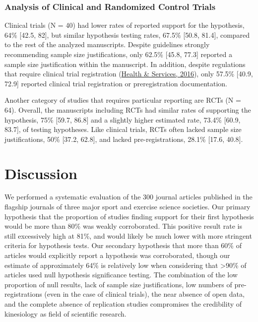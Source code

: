 \documentclass[]{cik}%
\begin{document}
\newpage

\hypertarget{analysis-of-clinical-and-randomized-control-trials}{%
\subsubsection{Analysis of Clinical and Randomized Control
Trials}\label{analysis-of-clinical-and-randomized-control-trials}}

Clinical trials (N = 40) had lower rates of reported support for the
hypothesis, 64\% {[}42.5, 82{]}, but similar hypothesis testing rates,
67.5\% {[}50.8, 81.4{]}, compared to the rest of the analyzed
manuscripts. Despite guidelines strongly recommending sample size
justifications, only 62.5\% {[}45.8, 77.3{]} reported a sample size
justification within the manuscript. In addition, despite regulations
that require clinical trial registration
(\protect\hyperlink{ref-clinreg2016}{Health \& Services, 2016}), only
57.5\% {[}40.9, 72.9{]} reported clinical trial registration or
preregistration documentation.

Another category of studies that requires particular reporting are RCTs
(N = 64). Overall, the manuscripts including RCTs had similar rates of
supporting the hypothesis, 75\% {[}59.7, 86.8{]} and a slightly higher
estimated rate, 73.4\% {[}60.9, 83.7{]}, of testing hypotheses. Like
clinical trials, RCTs often lacked sample size justifications, 50\%
{[}37.2, 62.8{]}, and lacked pre-registrations, 28.1\% {[}17.6, 40.8{]}.

\hypertarget{discussion}{%
\section{Discussion}\label{discussion}}

We performed a systematic evaluation of the 300 journal articles
published in the flagship journals of three major sport and exercise
science societies. Our primary hypothesis that the proportion of studies
finding support for their first hypothesis would be more than 80\% was
weakly corroborated. This positive result rate is still excessively high
at 81\%, and would likely be much lower with more stringent criteria for
hypothesis tests. Our secondary hypothesis that more than 60\% of
articles would explicitly report a hypothesis was corroborated, though
our estimate of approximately 64\% is relatively low when considering
that \textgreater90\% of articles used null hypothesis significance
testing. The combination of the low proportion of null results, lack of
sample size justifications, low numbers of pre-registrations (even in
the case of clinical trials), the near absence of open data, and the
complete absence of replication studies compromises the credibility of
kinesiology as field of scientific research.
\end{document}
